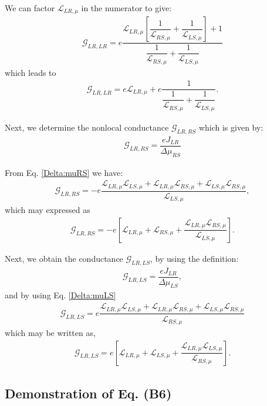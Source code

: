 We can factor $\mathcal{L}_{LR,\mu}$ in the numerator to give:
\begin{align*}
\mathcal{G}_{LR,LR}=
e\dfrac{\mathcal{L}_{LR,\mu}\left[\dfrac{1}{\mathcal{L}_{RS,\mu}}
+
\dfrac{1}{\mathcal{L}_{LS,\mu}}\right]
+
1}{\dfrac{1}{\mathcal{L}_{RS,\mu}}+\dfrac{1}{\mathcal{L}_{LS,\mu}}}
\end{align*}
which leads to
\begin{align}\label{GLRLR}
\mathcal{G}_{LR,LR}=e\mathcal{L}_{LR,\mu}+
e\dfrac{
1}{\dfrac{1}{\mathcal{L}_{RS,\mu}}+\dfrac{1}{\mathcal{L}_{LS,\mu}}}.
\end{align}


Next, we determine the nonlocal conductance $\mathcal{G}_{LR,RS}$ which is given by:
\begin{align*}
\mathcal{G}_{LR,RS}=\dfrac{eJ_{LR}}{\Delta\mu_{RS}}
\end{align*}

From Eq. \eqref{Delta:muRS} we have:
\begin{align*}
\mathcal{G}_{LR,RS}=
-e\dfrac{
\mathcal{L}_{LR,\mu} \mathcal{L}_{LS,\mu} 
+\mathcal{L}_{LR,\mu} \mathcal{L}_{RS,\mu} 
+\mathcal{L}_{LS,\mu} \mathcal{L}_{RS,\mu}}{\mathcal{L}_{LS,\mu}},
\end{align*}
which may expressed as
\begin{align}\label{GLRRS}
\mathcal{G}_{LR,RS}=
-e\left[\mathcal{L}_{LR,\mu}
+\mathcal{L}_{RS,\mu}+\dfrac{
\mathcal{L}_{LR,\mu} \mathcal{L}_{RS,\mu} }{\mathcal{L}_{LS,\mu}}\right].
\end{align}

Next, we obtain the conductance $\mathcal{G}_{LR,LS}$, by using the definition:
\begin{align*}
\mathcal{G}_{LR,LS}=\dfrac{eJ_{LR}}{\Delta\mu_{LS}},
\end{align*}
and by using Eq. \eqref{Delta:muLS}
\begin{align*}
\mathcal{G}_{LR,LS}
=
e\dfrac{\mathcal{L}_{LR,\mu} \mathcal{L}_{LS,\mu} + \mathcal{L}_{LR,\mu} \mathcal{L}_{RS,\mu} + \mathcal{L}_{LS,\mu} \mathcal{L}_{RS,\mu}}{\mathcal{L}_{RS,\mu}}
\end{align*}
which may be written as, 
\begin{align}\label{GLRLS}
\mathcal{G}_{LR,LS}
=
e\left[\mathcal{L}_{LR,\mu} + \mathcal{L}_{LS,\mu} +\dfrac{\mathcal{L}_{LR,\mu} \mathcal{L}_{LS,\mu}}{\mathcal{L}_{RS,\mu}}\right].
\end{align}


\subsection{Demonstration of Eq. (B6)}

